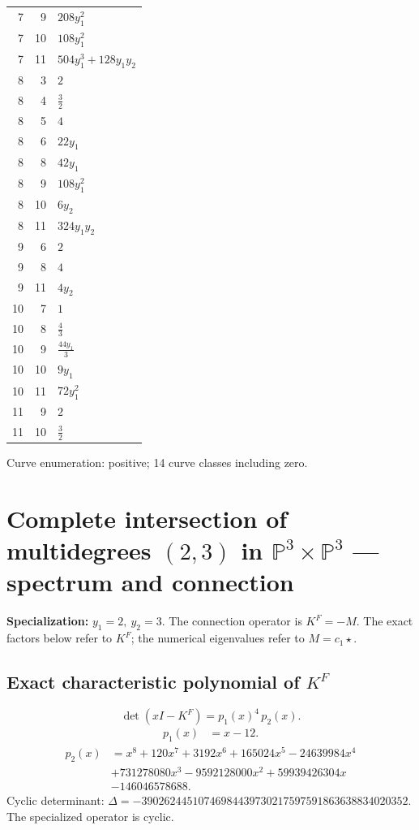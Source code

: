 \documentclass[10pt,a4paper]{article}
\begin{document}
{\begin{longtable}{rrp{125mm}}
7 & 9 & $208 y_{1}^{2}$\\
7 & 10 & $108 y_{1}^{2}$\\
7 & 11 & $504 y_{1}^{3} + 128 y_{1} y_{2}$\\
8 & 3 & $2$\\
8 & 4 & $\frac{3}{2}$\\
8 & 5 & $4$\\
8 & 6 & $22 y_{1}$\\
8 & 8 & $42 y_{1}$\\
8 & 9 & $108 y_{1}^{2}$\\
8 & 10 & $6 y_{2}$\\
8 & 11 & $324 y_{1} y_{2}$\\
9 & 6 & $2$\\
9 & 8 & $4$\\
9 & 11 & $4 y_{2}$\\
10 & 7 & $1$\\
10 & 8 & $\frac{4}{3}$\\
10 & 9 & $\frac{44 y_{1}}{3}$\\
10 & 10 & $9 y_{1}$\\
10 & 11 & $72 y_{1}^{2}$\\
11 & 9 & $2$\\
11 & 10 & $\frac{3}{2}$\\
\end{longtable}}
Curve enumeration: positive; 14 curve classes including zero.
\clearpage\section*{Complete intersection of multidegrees $(2,3)$ in $\mathbb P^{3}\times \mathbb P^{3}$ --- spectrum and connection}
\textbf{Specialization:} $y_1=2,\ y_2=3$. The connection operator is $K^F=-M$. The exact factors below refer to $K^F$; the numerical eigenvalues refer to $M=c_1\star$.
\subsection*{Exact characteristic polynomial of $K^F$}
\[\det(xI-K^F)=p_{1}(x)^{4}\,p_{2}(x).\]
\[\begin{aligned}p_{1}(x)&=x - 12.\end{aligned}\]
\[\begin{aligned}p_{2}(x)&=x^{8} + 120 x^{7} + 3192 x^{6} + 165024 x^{5} - 24639984 x^{4}\\&+731278080 x^{3} - 9592128000 x^{2} + 59939426304 x\\&-146046578688.\end{aligned}\]
Cyclic determinant: $\Delta=-39026244510746984439730217597591863638834020352$. The specialized operator is cyclic.
\end{document}
